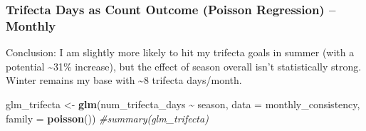 \documentclass[
  11pt,
]{article}
\newenvironment{Shaded}{\begin{snugshade}}{\end{snugshade}}
\newcommand{\AttributeTok}[1]{\textcolor[rgb]{0.13,0.29,0.53}{#1}}
\newcommand{\CommentTok}[1]{\textcolor[rgb]{0.56,0.35,0.01}{\textit{#1}}}
\newcommand{\FunctionTok}[1]{\textcolor[rgb]{0.13,0.29,0.53}{\textbf{#1}}}
\newcommand{\NormalTok}[1]{#1}
\newcommand{\OtherTok}[1]{\textcolor[rgb]{0.56,0.35,0.01}{#1}}
\newcommand{\SpecialCharTok}[1]{\textcolor[rgb]{0.81,0.36,0.00}{\textbf{#1}}}
\begin{document}
\subsubsection{Trifecta Days as Count Outcome (Poisson Regression) --
Monthly}\label{trifecta-days-as-count-outcome-poisson-regression-monthly}

Conclusion: I am slightly more likely to hit my trifecta goals in summer
(with a potential \textasciitilde31\% increase), but the effect of
season overall isn't statistically strong. Winter remains my base with
\textasciitilde8 trifecta days/month.

\begin{Shaded}
\begin{Highlighting}[]
\NormalTok{glm\_trifecta }\OtherTok{\textless{}{-}} \FunctionTok{glm}\NormalTok{(num\_trifecta\_days }\SpecialCharTok{\textasciitilde{}}\NormalTok{ season, }\AttributeTok{data =}\NormalTok{ monthly\_consistency, }\AttributeTok{family =} \FunctionTok{poisson}\NormalTok{())}
\CommentTok{\#summary(glm\_trifecta)}
\end{Highlighting}
\end{Shaded}
\end{document}

